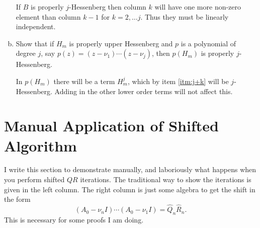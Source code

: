 \documentclass[10pt,letterpaper]{article}
\newcommand{\QR}{\ensuremath{QR} }
\begin{document}
\begin{enumerate}[(a)]
    If $B$ is properly $j$-Hessenberg then column $k$ will have one more non-zero element than column \mbox{$k-1$} for \mbox{$k =2,\ldots j$}.  Thus they must be linearly independent.

    \item Show that if $H_m$ is properly upper Hessenberg and $p$ is a polynomial of degree $j$, say $p(z) = \left(z-\nu_1\right)\cdots\left(z-\nu_j\right)$, then $p(H_m)$ is properly $j$-Hessenberg.

    In $p(H_m)$ there will be a term $H_m^j$, which by item \ref{itm:j+k} will be $j$-Hessenberg.  Adding in the other lower order terms will not affect this.


\end{enumerate}

\section{Manual Application of Shifted Algorithm}
I write this section to demonstrate manually, and laboriously what happens when you perform shifted \QR iterations.  The traditional way to show the iterations is given in the left column.  The right column is just some algebra to get the shift in the form
\begin{equation}
    \left( A_0-\nu_nI\right)\cdots\left( A_0 - \nu_1I \right) = \hat{Q}_n\hat{R}_n.
\end{equation}
This is necessary for some proofs I am doing.
\end{document}
